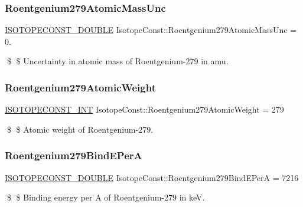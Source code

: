 \subsubsection{\texorpdfstring{Roentgenium279\+Atomic\+Mass\+Unc}{Roentgenium279AtomicMassUnc}}
{\footnotesize\ttfamily \mbox{\hyperlink{group___isotope_const-_macros_ga8f45a7272ce02c0b4c65c44636ed719a}{I\+S\+O\+T\+O\+P\+E\+C\+O\+N\+S\+T\+\_\+\+D\+O\+U\+B\+LE}} Isotope\+Const\+::\+Roentgenium279\+Atomic\+Mass\+Unc = 0.}

\$ \$ Uncertainty in atomic mass of Roentgenium-\/279 in amu. \mbox{\label{group___isotope_const-_roentgenium-_rg279_ga0297aa761f97148fc9cfd2983582f1a2}} 
\subsubsection{\texorpdfstring{Roentgenium279\+Atomic\+Weight}{Roentgenium279AtomicWeight}}
{\footnotesize\ttfamily \mbox{\hyperlink{group___isotope_const-_macros_ga5f18360b3e99483a35c32d789e62621c}{I\+S\+O\+T\+O\+P\+E\+C\+O\+N\+S\+T\+\_\+\+I\+NT}} Isotope\+Const\+::\+Roentgenium279\+Atomic\+Weight = 279}

\$ \$ Atomic weight of Roentgenium-\/279. \mbox{\label{group___isotope_const-_roentgenium-_rg279_ga617fefe69b8696e69a1ae52e81d9afb1}} 
\subsubsection{\texorpdfstring{Roentgenium279\+Bind\+E\+PerA}{Roentgenium279BindEPerA}}
{\footnotesize\ttfamily \mbox{\hyperlink{group___isotope_const-_macros_ga8f45a7272ce02c0b4c65c44636ed719a}{I\+S\+O\+T\+O\+P\+E\+C\+O\+N\+S\+T\+\_\+\+D\+O\+U\+B\+LE}} Isotope\+Const\+::\+Roentgenium279\+Bind\+E\+PerA = 7216}

\$ \$ Binding energy per A of Roentgenium-\/279 in keV. \mbox{\label{group___isotope_const-_roentgenium-_rg279_gadd987ecd261642f18404c0e2cf6f2297}} 
